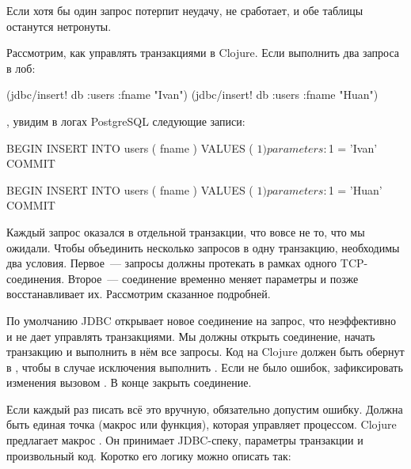 Если хотя бы один запрос потерпит неудачу,  не сработает, и обе таблицы останутся нетронуты.

Рассмотрим, как управлять транзакциями в Clojure. Если выполнить два запроса в лоб:

\begin{english}
  \begin{clojure}
(jdbc/insert! db :users {:fname "Ivan"})
(jdbc/insert! db :users {:fname "Huan"})
  \end{clojure}
\end{english}

\noindent
, увидим в логах PostgreSQL следующие записи:

\begin{english}
  \begin{sql}
BEGIN
INSERT INTO users ( fname ) VALUES ( $1 )
parameters: $1 = 'Ivan'
COMMIT

BEGIN
INSERT INTO users ( fname ) VALUES ( $1 )
parameters: $1 = 'Huan'
COMMIT
  \end{sql}
\end{english}

Каждый запрос оказался в отдельной транзакции, что вовсе не то, что мы ожидали. Чтобы объединить несколько запросов в одну транзакцию, необходимы два условия. Первое~--- запросы должны протекать в рамках одного TCP-соединения. Второе~--- соединение временно меняет параметры и позже восстанавливает их. Рассмотрим сказанное подробней.

По умолчанию JDBC открывает новое соединение на запрос, что неэффективно и не дает управлять транзакциями. Мы должны открыть соединение, начать транзакцию и выполнить в нём все запросы. Код на Clojure должен быть обернут в , чтобы в случае исключения выполнить . Если не было ошибок, зафиксировать изменения вызовом . В конце закрыть соединение.

Если каждый раз писать всё это вручную, обязательно допустим ошибку. Должна быть единая точка (макрос или функция), которая управляет процессом. Clojure предлагает макрос . Он принимает JDBC-спеку, параметры транзакции и произвольный код. Коротко его логику можно описать так:

